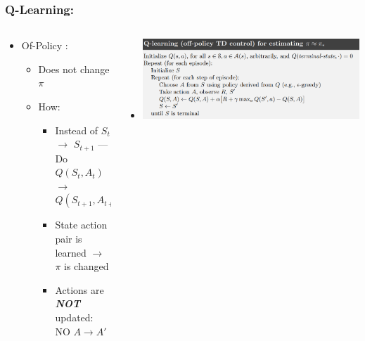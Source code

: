 \documentclass{beamer} %
\begin{document}
\begin{frame}
\frametitle{Q-Learning: }
\begin{columns}
    \begin{column}{.6\textwidth}
     	\begin{block}{}
			\begin{itemize}
				
				\item Of-Policy : 
					\begin{itemize}
						\item Does not change $\pi$
						\item How:
						\begin{itemize}
							\item Instead of $S_t$ $\longrightarrow$ $S_{t+1}$ --- Do $Q(S_t, A_t)$ $\longrightarrow$ $Q(S_{t+1}, A_{t+1})$
							\item State action pair is learned $\longrightarrow$  $\pi$ is changed 
							\item Actions are \textbf{\textit{NOT}}  updated: NO $A \longrightarrow A'$  
						\end{itemize} 
					\end{itemize}
				\end{itemize}
		\end{block}
    \end{column}
    \begin{column}{.4\textwidth}
    \begin{block}{}
		\begin{itemize}
			\item \includegraphics[height=.6\textheight, width=\columnwidth]{qlearning.png}

		\end{itemize}
    \end{block}
    \end{column}
\end{columns}
			
\end{frame}
\end{document}
